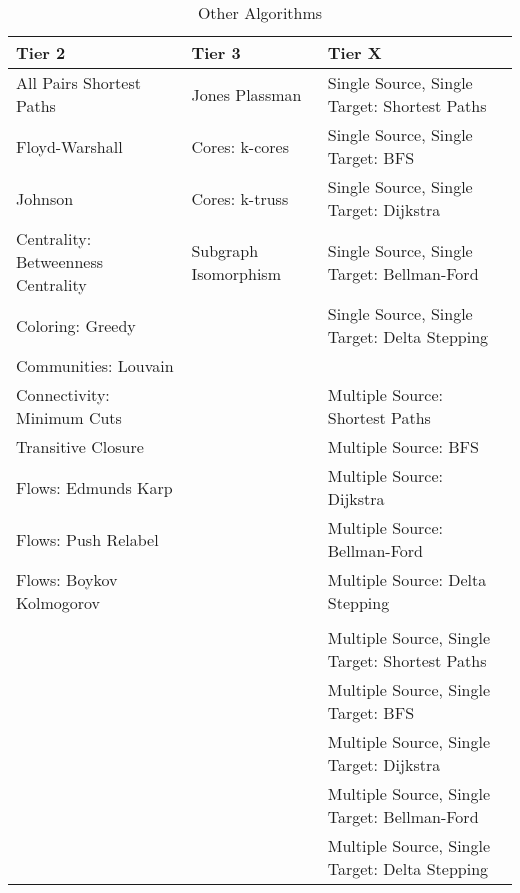 \begin{table}[h!]
\begin{center}
{\begin{tabular}{l|l|l}
\hline
    \textbf{Tier 2} & \textbf{Tier 3} & \textbf{Tier X} \\
\hline
    All Pairs Shortest Paths & Jones Plassman & Single Source, Single Target: Shortest Paths\\
    Floyd-Warshall & Cores: k-cores & Single Source, Single Target: BFS \\
    Johnson & Cores: k-truss & Single Source, Single Target: Dijkstra \\
    Centrality: Betweenness Centrality & Subgraph Isomorphism & Single Source, Single Target: Bellman-Ford \\
    Coloring: Greedy & & Single Source, Single Target: Delta Stepping \\
    Communities: Louvain & &  \\
    Connectivity: Minimum Cuts & & Multiple Source: Shortest Paths \\
    Transitive Closure & & Multiple Source: BFS \\
    Flows: Edmunds Karp & & Multiple Source: Dijkstra \\
    Flows: Push Relabel & & Multiple Source: Bellman-Ford \\
    Flows: Boykov Kolmogorov & & Multiple Source: Delta Stepping \\
    & &  \\
    & & Multiple Source, Single Target: Shortest Paths \\
    & & Multiple Source, Single Target: BFS \\
    & & Multiple Source, Single Target: Dijkstra \\
    & & Multiple Source, Single Target: Bellman-Ford \\
    & & Multiple Source, Single Target: Delta Stepping \\
\hline
\end{tabular}}
\caption{Other Algorithms}
\label{tab:other_algorithms}
\end{center}
\end{table}






